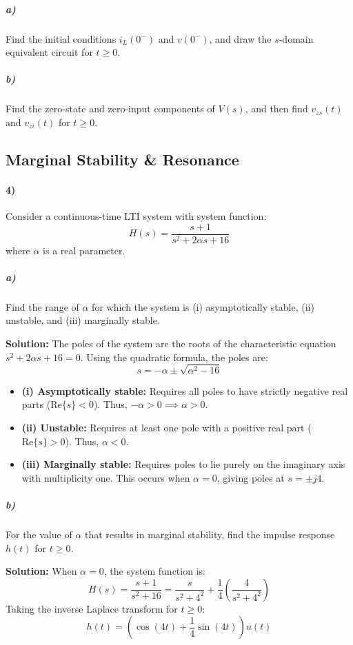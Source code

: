 \documentclass{article}
\begin{document}
\subparagraph{a)} Find the initial conditions $i_L(0^-)$ and $v(0^-)$, and draw the $s$-domain equivalent circuit for $t \geq 0$.

\subparagraph{b)} Find the zero-state and zero-input components of $V(s)$, and then find $v_{zs}(t)$ and $v_{zi}(t)$ for $t \geq 0$.

\vfill

\newpage

\subsection*{Marginal Stability \& Resonance}

\paragraph{4)} Consider a continuous-time LTI system with system function:
$$H(s) = \frac{s + 1}{s^2 + 2\alpha s + 16}$$
where $\alpha$ is a real parameter.

\subparagraph{a)} Find the range of $\alpha$ for which the system is (i) asymptotically stable, (ii) unstable, and (iii) marginally stable.

\textbf{Solution:} The poles of the system are the roots of the characteristic equation $s^2 + 2\alpha s + 16 = 0$. Using the quadratic formula, the poles are:
$$s = -\alpha \pm \sqrt{\alpha^2 - 16}$$
\begin{itemize}
    \item \textbf{(i) Asymptotically stable:} Requires all poles to have strictly negative real parts ($\text{Re}\{s\} < 0$). Thus, $-\alpha > 0 \implies \alpha > 0$.
    \item \textbf{(ii) Unstable:} Requires at least one pole with a positive real part ($\text{Re}\{s\} > 0$). Thus, $\alpha < 0$.
    \item \textbf{(iii) Marginally stable:} Requires poles to lie purely on the imaginary axis with multiplicity one. This occurs when $\alpha = 0$, giving poles at $s = \pm j4$.
\end{itemize}

\subparagraph{b)} For the value of $\alpha$ that results in marginal stability, find the impulse response $h(t)$ for $t \geq 0$.

\textbf{Solution:} When $\alpha = 0$, the system function is:
$$H(s) = \frac{s + 1}{s^2 + 16} = \frac{s}{s^2 + 4^2} + \frac{1}{4}\left(\frac{4}{s^2 + 4^2}\right)$$
Taking the inverse Laplace transform for $t \geq 0$:
$$h(t) = \left( \cos(4t) + \frac{1}{4}\sin(4t) \right) u(t)$$
\end{document}
